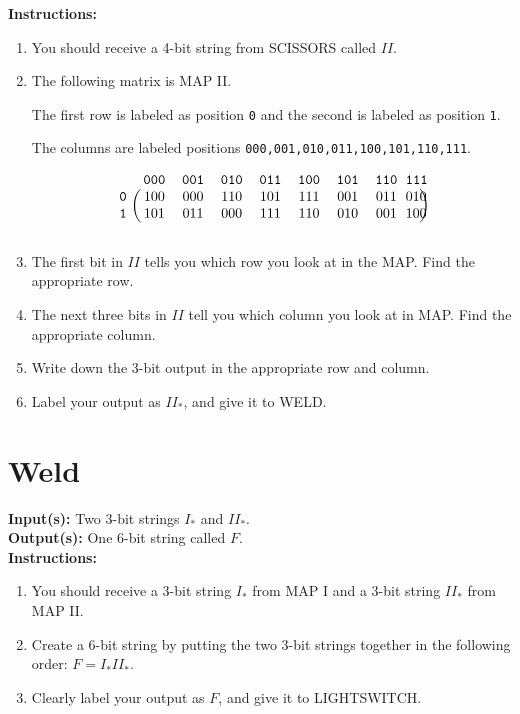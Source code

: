 \documentclass[12pt]{amsart}
\theoremstyle{plain}
\theoremstyle{definition}
\theoremstyle{remark}
\begin{document}
\textbf{Instructions:}
\begin{enumerate}[1.]
	\item You should receive a 4-bit string from SCISSORS called $II$. 
	\item The following matrix is  MAP II.
	
	The first row is labeled as position \texttt{0} and the second is labeled as position \texttt{1}.
	
	The columns are labeled positions \texttt{000,001,010,011,100,101,110,111}.
	
		\begin{center}\[
	\begin{blockarray}{ccccccccc}
	&&\texttt{000}&\texttt{001}&\texttt{010}&\texttt{011}&\texttt{100}&\texttt{101}&\texttt{110}&\texttt{111}\\
	\begin{block}{c(cccccccc)}
	&\texttt{0} &100 & 000 & 110 & 101 & 111 & 001 & 011 & 010\\
	&\texttt{1} &101 & 011 & 000 & 111 & 110 & 010 & 001 & 100\\
	\end{block}
	\end{blockarray}
	\] \end{center}

	\item The first bit in $II$ tells you which row you look at in the MAP.  Find the appropriate row.
	\item The next three bits in $II$ tell you which column you look at in MAP.  Find the appropriate column.
	\item Write down the 3-bit output in the appropriate row and column.
	\item Label your output as $II_*$, and give it to WELD.
\end{enumerate}

\newpage
\section*{Weld}
\textbf{Input(s):}  Two 3-bit strings $I_*$ and $II_*$.\\

\textbf{Output(s):} One 6-bit string called $F$.\\

\textbf{Instructions:}
\begin{enumerate}[1.]
	\item You should receive a 3-bit string $I_*$ from MAP I and a 3-bit string $II_*$ from MAP II.
	\item Create a 6-bit string by putting the two 3-bit strings together in the following order: $F = I_* II_*$.
	\item Clearly label your output as $F$, and give it to LIGHTSWITCH.
\end{enumerate}
\end{document}
